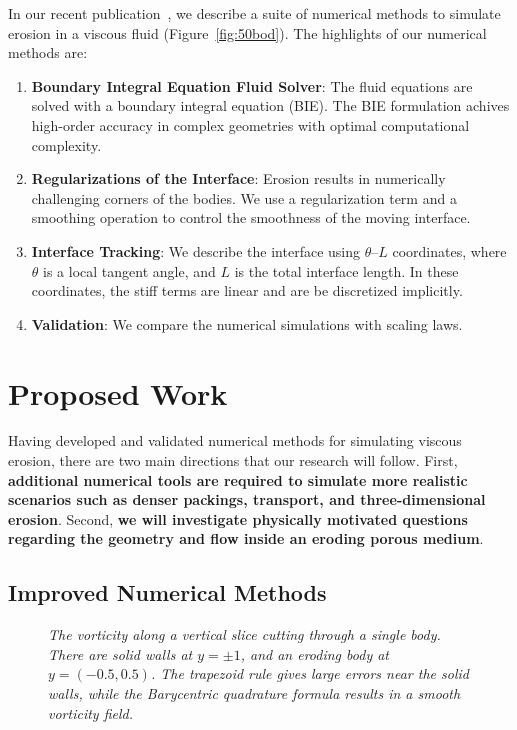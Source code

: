 \documentclass[11pt]{article}
\newcommand{\thL}{$\theta$--$L$}
\begin{document}
In our recent publication~\cite{qua-moo2018}, we describe a suite of
numerical methods to simulate erosion in a viscous fluid
(Figure~\ref{fig:50bod}).  The highlights of our numerical methods are:
\begin{enumerate}[topsep=0pt,itemsep=-1ex,partopsep=1ex,parsep=1ex]
  \item {\bf Boundary Integral Equation Fluid Solver}: The
  fluid equations are solved with a boundary integral equation (BIE).
  The BIE formulation achives high-order accuracy in complex geometries
  with optimal computational complexity.

  \item {\bf Regularizations of the Interface}: Erosion results in
  numerically challenging corners of the bodies.  We use a
  regularization term and a smoothing operation to control the
  smoothness of the moving interface.

  \item {\bf Interface Tracking}: We describe the interface using
  {\thL} coordinates, where $\theta$ is a local tangent angle, and $L$
  is the total interface length.  In these coordinates, the
  stiff terms are linear and are be discretized implicitly.

  \item {\bf Validation}: We compare the numerical simulations with
  scaling laws.
\end{enumerate}

\section{Proposed Work}
Having developed and validated numerical methods for simulating viscous
erosion, there are two main directions that our research will follow.
First, {\bf additional numerical tools are required to simulate more
realistic scenarios such as denser packings, transport, and
three-dimensional erosion}.  Second, {\bf we will investigate physically
motivated questions regarding the geometry and flow inside an eroding
porous medium}.

\subsection{Improved Numerical Methods}
\begin{figure}
\centering

\caption{\label{fig:vort1} \em The vorticity along a vertical slice
cutting through a single body.  There are solid walls at $y = \pm 1$,
and an eroding body at $y = (-0.5,0.5)$.  The trapezoid rule gives large
errors near the solid walls, while the Barycentric quadrature formula
results in a smooth vorticity field.}
\end{figure}
\end{document}
